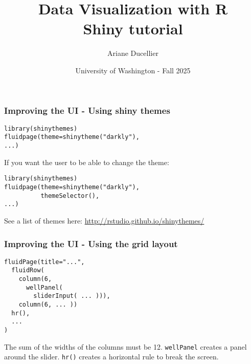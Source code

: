 \documentclass{beamer}
\title[Data Visualization with R - Shiny tutorial]{Data Visualization with R \\ Shiny tutorial}
\author{Ariane Ducellier}
\date{University of Washington - Fall 2025}
\begin{document}
	\begin{frame}
		\titlepage
	\end{frame}

	\begin{frame}[fragile]
		\frametitle{Improving the UI - Using shiny themes}
		
		\begin{exampleblock}{}
		\begin{BVerbatim}
library(shinythemes)
fluidpage(theme=shinytheme("darkly"),
...)
		\end{BVerbatim}
		\end{exampleblock}{}

		\vspace{2em}

		If you want the user to be able to change the theme:
		
		\begin{exampleblock}{}
		\begin{BVerbatim}
library(shinythemes)
fluidpage(theme=shinytheme("darkly"),
          themeSelector(),
...)
		\end{BVerbatim}
		\end{exampleblock}{}

		\vspace{2em}

		See a list of themes here: \href{http://rstudio.github.io/shinythemes/}{http://rstudio.github.io/shinythemes/}
 	
	\end{frame}

	\begin{frame}[fragile]
		\frametitle{Improving the UI - Using the grid layout}
		
		\begin{exampleblock}{}
		\begin{BVerbatim}
fluidPage(title="...",
  fluidRow(
    column(6,
      wellPanel(
        sliderInput( ... ))),
    column(6, ... ))
  hr(),
  ...
)      
		\end{BVerbatim}
		\end{exampleblock}{}

		\vspace{1em}

		The sum of the  widths of the columns must be 12. \verb|wellPanel| creates a panel around the slider. \verb|hr()| creates a horizontal rule to break the screen.

	\end{frame}
\end{document}
